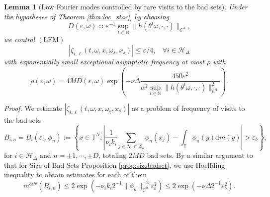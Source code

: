 \documentclass[a4paper]{article}
\theoremstyle{plain}
\newtheorem{lemma}[theorem]{Lemma}
\theoremstyle{definition}
\newcommand{\T}{\mathbb{T}}
\newcommand{\N}{\mathbb{N}}
\newcommand{\Hil}{\mathcal{H}}
\newcommand{\Lil}{\mathcal{L}}
\newcommand{\Nil}{\mathcal{N}}
\begin{document}

\begin{lemma}[Low Fourier modes controlled by rare visits to the bad sets]\label{lemma:zeta_i4}
	Under the hypotheses of Theorem \ref{thm:loc_star}, by choosing $$D(\varepsilon,\omega) \asymp \varepsilon^{-1} \sup_{t\in\N }\|h(\theta^t\omega,\cdot,\cdot)\|_{C^4},$$ we control $\mathrm{(LFM)}$ 
	\[
	|\zeta_{i,\ell}(t,\omega,x,\omega_{{s}},x_{{s}})|\leq \varepsilon/4,~~~~\forall i\in\Hil_{\Delta}
	\]
	with exponentially small exceptional asymptotic frequency at most $\rho$ with 
	$$\rho(\varepsilon,\omega)= 4MD(\varepsilon,\omega) \exp\left(-\nu\Delta\frac{450\varepsilon^2}{\alpha^2\sup_{t\in\N }\|h(\theta^t\omega,\cdot,\cdot)\|^2_{C^4}} \right).$$
\end{lemma}

\textit{Proof.} 
We estimate $|\zeta_{i,\ell}(t,\omega,x,\omega_{{s}},x_{{s}})|$ as a problem of frequency of visits to the bad sets 
$$B_{i,n}= B_i(\varepsilon_b, \phi_n):=\left\{x\in\T^N: \left|\frac{1}{\nu_i k_i}\sum_{j\in\Nil_i\cap\Lil_{\delta}} \phi_n(x_j) - \int_{\T} \phi_n(y)\mathrm{d}m(y)\right|>\varepsilon_b\right\},$$
for $i\in\Hil_{\Delta}$ and $n=\pm1,\cdots,\pm D$, totaling $2MD$ bad sets. By a similar argument to that for Size of Bad Sets Proposition \ref{prop:sizebadset}, we use Hoeffding inequality to obtain estimates for each of them
$$m^{\otimes N} (B_{i,n}) \leq 2\exp(-\nu_i k_i2^{-1} \|\phi_{n}\|_{C^0}^{-2} \varepsilon_b^2) \leq 2\exp(-\nu\Delta 2^{-1}\varepsilon_b^2).$$
\end{document}

